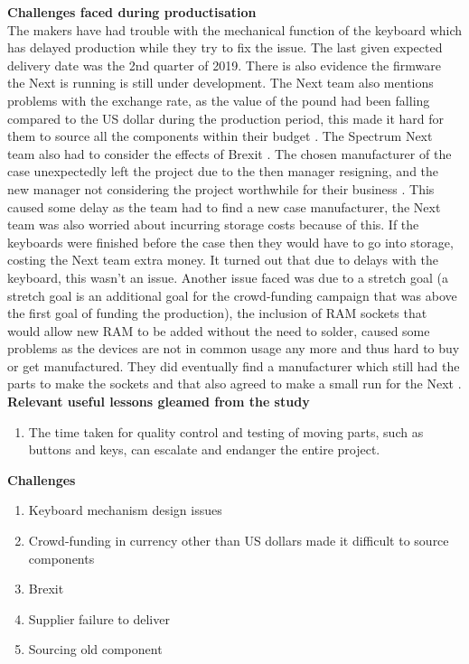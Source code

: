 \textbf{Challenges faced during productisation}\\
The makers have had trouble with the mechanical function of the keyboard which has delayed production while they try to fix the issue. The last given expected delivery date was the 2nd quarter of 2019. There is also evidence the firmware the Next is running is still under development. The Next team also mentions problems with the exchange rate, as the value of the pound had been falling compared to the US dollar during the production period, this made it hard for them to source all the components within their budget 
\cite{RN159}. The Spectrum Next team also had to consider the effects of Brexit 
\cite{RN157}. The chosen manufacturer of the case unexpectedly left the project due to the then manager resigning, and the new manager not considering the project worthwhile for their business 
\cite{RN158}. This caused some delay as the team had to find a new case manufacturer, the Next team was also worried about incurring storage costs because of this. If the keyboards were finished before the case then they would have to go into storage, costing the Next team extra money. It turned out that due to delays with the keyboard, this wasn't an issue. Another issue faced was due to a stretch goal (a stretch goal is an additional goal for the crowd-funding campaign that was above the first goal of funding the production), the inclusion of RAM sockets that would allow new RAM to be added without the need to solder, caused some problems as the devices are not in common usage any more and thus hard to buy or get manufactured. They did eventually find a manufacturer which still had the parts to make the sockets and that also agreed to make a small run for the Next 
\cite{RN159}. \\

\textbf{Relevant useful lessons gleamed from the study}
\begin{enumerate}
\item The time taken for quality control and testing of moving parts, such as buttons and keys, can escalate and endanger the entire project.\\
\end{enumerate}

\textbf{Challenges}
\begin{enumerate}
\item Keyboard mechanism design issues
\item Crowd-funding in currency other than US dollars made it difficult to source components
\item Brexit
\item Supplier failure to deliver
\item Sourcing old component 
\end{enumerate}

